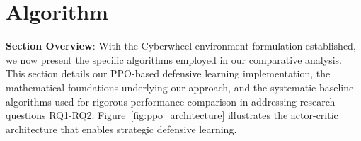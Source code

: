 \documentclass[12pt,oneside]{article}
\begin{document}
\section{Algorithm}

\textbf{Section Overview}: With the Cyberwheel environment formulation established, we now present the specific algorithms employed in our comparative analysis. This section details our PPO-based defensive learning implementation, the mathematical foundations underlying our approach, and the systematic baseline algorithms used for rigorous performance comparison in addressing research questions RQ1-RQ2. Figure~\ref{fig:ppo_architecture} illustrates the actor-critic architecture that enables strategic defensive learning.

\end{document}
